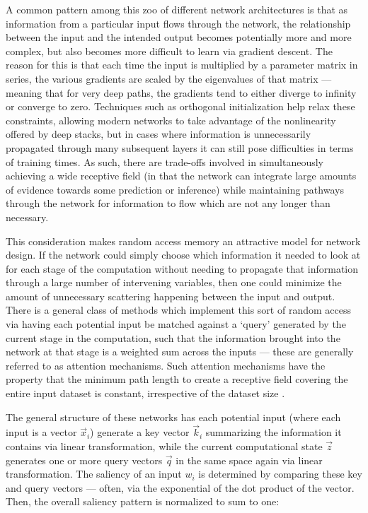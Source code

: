\documentclass[letterpaper]{article}
\begin{document}
A common pattern among this zoo of different network architectures is that as information from a particular input flows through the network, the relationship between the input and the intended output becomes potentially more and more complex, but also becomes more difficult to learn via gradient descent. The reason for this is that each time the input is multiplied by a parameter matrix in series, the various gradients are scaled by the eigenvalues of that matrix --- meaning that for very deep paths, the gradients tend to either diverge to infinity or converge to zero. Techniques such as orthogonal initialization \citep{saxe2013exact} help relax these constraints, allowing modern networks to take advantage of the nonlinearity offered by deep stacks, but in cases where information is unnecessarily propagated through many subsequent layers it can still pose difficulties in terms of training times. As such, there are trade-offs involved in simultaneously achieving a wide receptive field (in that the network can integrate large amounts of evidence towards some prediction or inference) while maintaining pathways through the network for information to flow which are not any longer than necessary.

This consideration makes random access memory an attractive model for network design. If the network could simply choose which information it needed to look at for each stage of the computation without needing to propagate that information through a large number of intervening variables, then one could minimize the amount of unnecessary scattering happening between the input and output. There is a general class of methods which implement this sort of random access via having each potential input be matched against a `query' generated by the current stage in the computation, such that the information brought into the network at that stage is a weighted sum across the inputs --- these are generally referred to as attention mechanisms. Such attention mechanisms have the property that the minimum path length to create a receptive field covering the entire input dataset is constant, irrespective of the dataset size \citep{vaswani2017attention}.

The general structure of these networks has each potential input (where each input is a vector $\vec{x}_i$) generate a key vector $\vec{k}_i$ summarizing the information it contains via linear transformation, while the current computational state $\vec{z}$ generates one or more query vectors $\vec{q}$ in the same space again via linear transformation. The saliency of an input $w_i$ is determined by comparing these key and query vectors --- often, via the exponential of the dot product of the vector. Then, the overall saliency pattern is normalized to sum to one:
\end{document}
